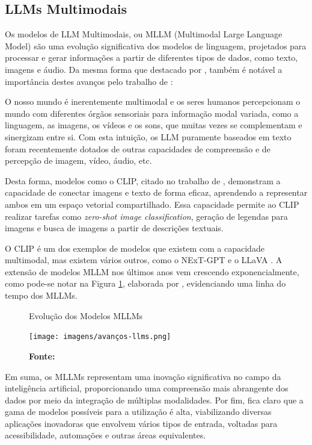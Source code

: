 \subsection{LLMs Multimodais}

Os modelos de LLM Multimodais, ou MLLM (Multimodal Large Language Model) são uma evolução significativa dos modelos de linguagem, projetados para processar e gerar informações a partir de diferentes tipos de dados, como texto, imagens e áudio. Da mesma forma que destacado por , também é notável a importância destes avanços pelo trabalho de :

\begin{citacao}
    O nosso mundo é inerentemente multimodal e os seres humanos percepcionam o mundo com diferentes órgãos sensoriais para informação modal variada, como a linguagem, as imagens, os vídeos e os sons, que muitas vezes se complementam e sinergizam entre si. Com esta intuição, os LLM puramente baseados em texto foram recentemente dotados de outras capacidades de compreensão e de percepção de imagem, vídeo, áudio, etc.
\end{citacao}

Desta forma, modelos como o CLIP, citado no trabalho de , demonstram a capacidade de conectar imagens e texto de forma eficaz, aprendendo a representar ambos em um espaço vetorial compartilhado. Essa capacidade permite ao CLIP realizar tarefas como  \textit{zero-shot image classification}, geração de legendas para imagens e  busca de imagens a partir de descrições textuais.

O CLIP é um dos exemplos de modelos que existem com a capacidade multimodal, mas existem vários outros, como o NExT-GPT \cite{wu2023} e o LLaVA \cite{liu2023}. A extensão de modelos MLLM nos últimos anos vem crescendo exponencialmente, como pode-se notar na Figura \ref{fig:3}, elaborada por , evidenciando uma linha do tempo dos MLLMs.

\begin{figure}[!h]
     \caption{Evolução dos Modelos MLLMs}
     \centering
     \texttt{[image: imagens/avanços-llms.png]}
     \label{fig:3}
     \caption*{\textbf{Fonte:} }
\end{figure}

Em suma, os MLLMs representam uma inovação significativa no campo da inteligência artificial, proporcionando uma compreensão mais abrangente dos dados por meio da integração de múltiplas modalidades. Por fim, fica claro que a gama de modelos possíveis para a utilização é alta, viabilizando diversas aplicações inovadoras que envolvem vários tipos de entrada, voltadas para acessibilidade, automações e outras áreas equivalentes.

